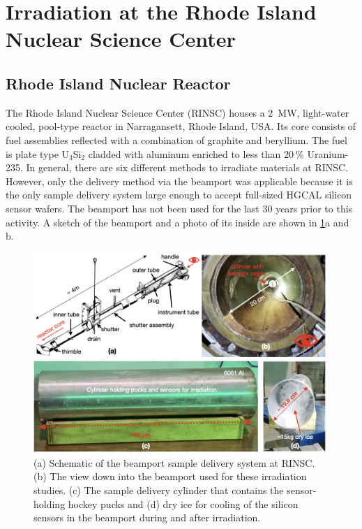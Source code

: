 \section{Irradiation at the Rhode Island Nuclear Science Center}
\label{sec:irradiation}

\subsection{Rhode Island Nuclear Reactor}
\label{subsec:RINSC}
The Rhode Island Nuclear Science Center (RINSC) houses a \SI{2}{\mega\watt}, light-water cooled, pool-type reactor in Narragansett, Rhode Island, USA.
Its core consists of fuel assemblies reflected with a combination of graphite and beryllium.
The fuel is plate type U$_3$Si$_2$ cladded with aluminum enriched to less than 20$~\%$ Uranium-235.
In general, there are six different methods to irradiate materials at RINSC.
However, only the delivery method via the beamport was applicable because it is the only sample delivery system large enough to accept full-sized HGCAL silicon sensor wafers.
The beamport has not been used for the last 30 years prior to this activity.
A sketch of the beamport and a photo of its inside are shown in \ref{fig:Beamport_Schematic}a and b.
\begin{figure}[!hbt]
  \begin{center}
    \includegraphics[width=0.99\textwidth]{figures/figures_edited_001.jpeg}
    \caption{(a) Schematic of the beamport sample delivery system at RINSC.
    (b) The view down into the beamport used for these irradiation studies.
    (c) The sample delivery cylinder that contains the sensor-holding hockey pucks and (d) dry ice for cooling of the silicon sensors in the beamport during and after irradiation.
    }
    \label{fig:Beamport_Schematic}
  \end{center}
\end{figure}
